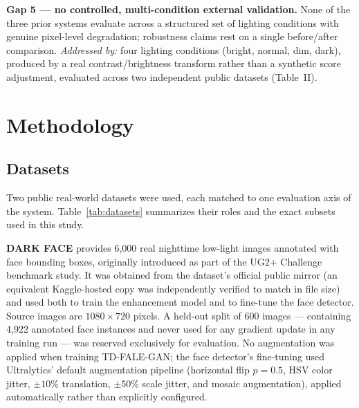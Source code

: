\documentclass[conference]{IEEEtran}
\begin{document}
\textbf{Gap 5 --- no controlled, multi-condition external
validation.} None of the three prior systems evaluate across a
structured set of lighting conditions with genuine pixel-level
degradation; robustness claims rest on a single before/after
comparison. \textit{Addressed by:} four lighting conditions
(bright, normal, dim, dark), produced by a real contrast/brightness
transform rather than a synthetic score adjustment, evaluated
across two independent public datasets (Table~II).

\section{Methodology}
\subsection{Datasets}
Two public real-world datasets were used, each matched to one
evaluation axis of the system. Table~\ref{tab:datasets} summarizes
their roles and the exact subsets used in this study.

\begin{table}[!t]
\caption{Dataset Summary and Experimental Use}
\label{tab:datasets}
\centering
{}
\end{table}

\textbf{DARK FACE} \cite{darkface} provides 6{,}000 real
nighttime low-light images annotated with face bounding boxes,
originally introduced as part of the UG2+ Challenge benchmark
study. It was obtained from the dataset's official public
mirror (an equivalent Kaggle-hosted copy \cite{darkface_data}
was independently verified to match in file size) and used both
to train the enhancement model and to fine-tune the face
detector. Source images are $1080\times720$ pixels. A held-out
split of 600 images --- containing 4{,}922 annotated face
instances and never used for any gradient update in any training
run --- was reserved exclusively for evaluation. No augmentation
was applied when training TD-FALE-GAN; the face detector's
fine-tuning used Ultralytics' default augmentation pipeline
(horizontal flip $p{=}0.5$, HSV color jitter, $\pm10\%$
translation, $\pm50\%$ scale jitter, and mosaic augmentation),
applied automatically rather than explicitly configured.
\end{document}
